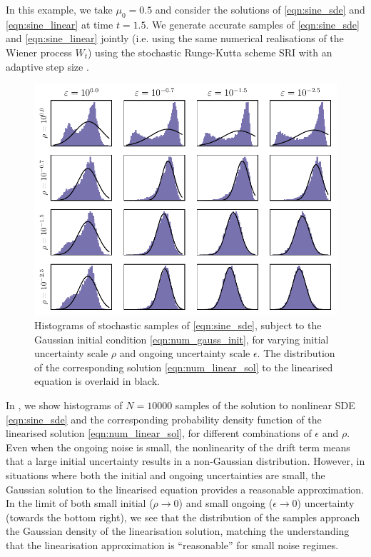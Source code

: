 In this example, we take \(\mu_0 = 0.5\) and consider the solutions of \cref{eqn:sine_sde} and \cref{eqn:sine_linear} at time \(t = 1.5\).
We generate accurate samples of \cref{eqn:sine_sde} and \cref{eqn:sine_linear} jointly (i.e. using the same numerical realisations of the Wiener process \(W_t\)) using the stochastic Runge-Kutta scheme SRI \citep{Rossler_2010_RungeKuttaMethodsStrong} with an adaptive step size \citep{RackauckasNie_2017_AdaptiveMethodsStochastic}.

\begin{figure}
	\begin{center}
		\includegraphics[width=\textwidth]{chp04_paper_numerics/figures/sine/selected_hists.pdf}
		\caption{Histograms of stochastic samples of \cref{eqn:sine_sde}, subject to the Gaussian initial condition \cref{eqn:num_gauss_init}, for varying initial uncertainty scale \(\rho\) and ongoing uncertainty scale \(\epsilon\).
			The distribution of the corresponding solution \cref{eqn:num_linear_sol} to the linearised equation is overlaid in black.}
		\label{fig:sine_hists}
	\end{center}
\end{figure}

In , we show histograms of \(N = 10000\) samples of the solution to nonlinear SDE \cref{eqn:sine_sde} and the corresponding probability density function of the linearised solution \cref{eqn:num_linear_sol}, for different combinations of \(\epsilon\) and \(\rho\).
Even when the ongoing noise is small, the nonlinearity of the drift term means that a large initial uncertainty results in a non-Gaussian distribution.
However, in situations where both the initial and ongoing uncertainties are small, the Gaussian solution to the linearised equation provides a reasonable approximation.
In the limit of both small initial (\(\rho \to 0\)) and small ongoing (\(\epsilon \to 0\)) uncertainty (towards the bottom right), we see that the distribution of the samples approach the Gaussian density of the linearisation solution, matching the understanding that the linearisation approximation is ``reasonable'' for small noise regimes.

